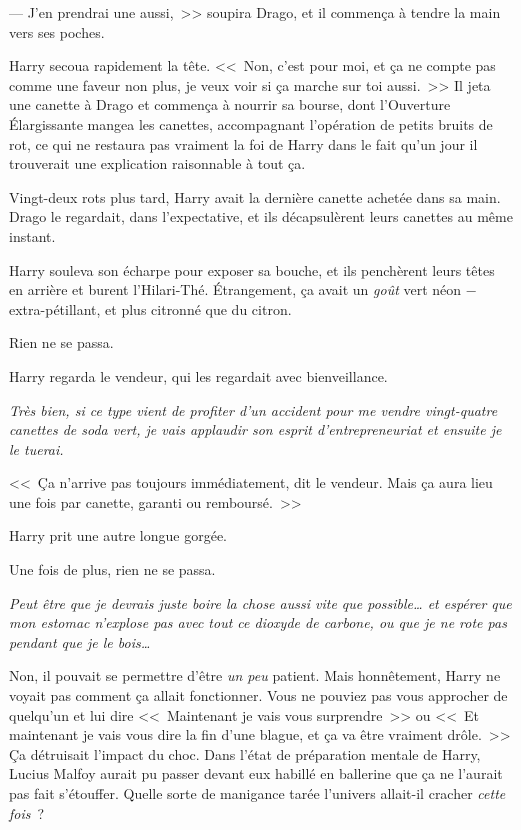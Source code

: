 --- J'en prendrai une aussi,~>> soupira Drago, et il commença à tendre la main vers ses poches.

Harry secoua rapidement la tête. <<~Non, c'est pour moi, et ça ne compte pas comme une faveur non plus, je veux voir si ça marche sur toi aussi.~>> Il jeta une canette à Drago et commença à nourrir sa bourse, dont l'Ouverture Élargissante mangea les canettes, accompagnant l'opération de petits bruits de rot, ce qui ne restaura pas vraiment la foi de Harry dans le fait qu'un jour il trouverait une explication raisonnable à tout ça.

Vingt-deux rots plus tard, Harry avait la dernière canette achetée dans sa main. Drago le regardait, dans l'expectative, et ils décapsulèrent leurs canettes au même instant.

Harry souleva son écharpe pour exposer sa bouche, et ils penchèrent leurs têtes en arrière et burent l'Hilari-Thé. Étrangement, ça avait un \emph{goût} vert néon − extra-pétillant, et plus citronné que du citron.

Rien ne se passa.

Harry regarda le vendeur, qui les regardait avec bienveillance.

\emph{Très bien, si ce type vient de profiter d'un accident pour me vendre vingt-quatre canettes de soda vert, je vais applaudir son esprit d'entrepreneuriat et ensuite je le tuerai.}

<<~Ça n'arrive pas toujours immédiatement, dit le vendeur. Mais ça aura lieu une fois par canette, garanti ou remboursé.~>>

Harry prit une autre longue gorgée.

Une fois de plus, rien ne se passa.

\emph{Peut être que je devrais juste boire la chose aussi vite que possible… et espérer que mon estomac n'explose pas avec tout ce dioxyde de carbone, ou que je ne rote pas pendant que je le bois…}

Non, il pouvait se permettre d'être \emph{un peu} patient. Mais honnêtement, Harry ne voyait pas comment ça allait fonctionner. Vous ne pouviez pas vous approcher de quelqu'un et lui dire <<~Maintenant je vais vous surprendre~>> ou <<~Et maintenant je vais vous dire la fin d'une blague, et ça va être vraiment drôle.~>> Ça détruisait l'impact du choc. Dans l'état de préparation mentale de Harry, Lucius Malfoy aurait pu passer devant eux habillé en ballerine que ça ne l'aurait pas fait s'étouffer. Quelle sorte de manigance tarée l'univers allait-il cracher \emph{cette fois}~?

